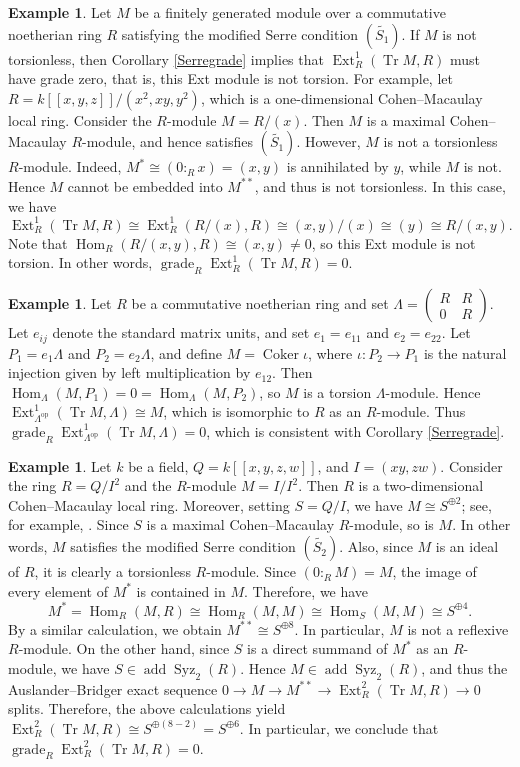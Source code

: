 \documentclass{amsart}
\theoremstyle{definition}
\newtheorem{ex}[thm]{Example}
\theoremstyle{remark}
\numberwithin{equation}{thm}
\def\add{\operatorname{add}}
\def\Cok{\operatorname{Coker}}
\def\Ext{\operatorname{Ext}}
\def\grade{\operatorname{grade}}
\def\Hom{\operatorname{Hom}}
\def\Syz{\operatorname{Syz}}
\def\tr{\operatorname{Tr}}
\begin{document}
\begin{ex}
Let $M$ be a finitely generated module over a commutative noetherian ring $R$ satisfying the modified Serre condition $(\widetilde{S_1})$. If $M$ is not torsionless, then Corollary \ref{Serregrade} implies that $\Ext^1_R(\tr M,R)$ must have grade zero, that is, this Ext module is not torsion.
For example, let $R=k[[x,y,z]]/(x^2,xy,y^2)$, which is a one-dimensional Cohen--Macaulay local ring. 
Consider the $R$-module $M=R/(x)$. Then $M$ is a maximal Cohen--Macaulay $R$-module, and hence satisfies $(\widetilde{S_1})$. However, $M$ is not a torsionless $R$-module. Indeed, $M^*\cong(0:_R x)=(x,y)$ is annihilated by $y$, while $M$ is not. Hence $M$ cannot be embedded into $M^{**}$, and thus is not torsionless.
In this case, we have
$$
\Ext^1_R(\tr M,R)\cong\Ext^1_R(R/(x),R)\cong(x,y)/(x)\cong(y)\cong R/(x,y).
$$
Note that $\Hom_R(R/(x,y),R)\cong(x,y)\ne0$, so this Ext module is not torsion. In other words, $\grade_R\Ext^1_R(\tr M,R)=0$.
\end{ex}

\begin{ex}
Let $R$ be a commutative noetherian ring and set $\Lambda=\begin{pmatrix}R&R\\0&R\end{pmatrix}$. Let $e_{ij}$ denote the standard matrix units, and set $e_1=e_{11}$ and $e_2=e_{22}$. Let $P_1=e_1\Lambda$ and $P_2=e_2\Lambda$, and define $M=\Cok\iota$, where $\iota:P_2\to P_1$ is the natural injection given by left multiplication by $e_{12}$. Then $\Hom_\Lambda(M,P_1)=0=\Hom_\Lambda(M,P_2)$, so $M$ is a torsion $\Lambda$-module. Hence $\Ext^1_{\Lambda^{\mathrm{op}}}(\tr M,\Lambda)\cong M$, which is isomorphic to $R$ as an $R$-module. Thus $\grade_R\Ext^1_{\Lambda^{\mathrm{op}}}(\tr M,\Lambda)=0$, which is consistent with Corollary \ref{Serregrade}.
\end{ex}

\begin{ex}
Let $k$ be a field, $Q=k[[x,y,z,w]]$, and $I=(xy,zw)$. Consider the ring $R=Q/I^2$ and the $R$-module $M=I/I^2$. Then $R$ is a two-dimensional Cohen--Macaulay local ring. Moreover, setting $S=Q/I$, we have $M\cong S^{\oplus 2}$; see, for example, \cite[Theorem 19.9]{Mat}. Since $S$ is a maximal Cohen--Macaulay $R$-module, so is $M$. In other words, $M$ satisfies the modified Serre condition $(\widetilde{S_2})$. Also, since $M$ is an ideal of $R$, it is clearly a torsionless $R$-module.
Since $(0:_R M)=M$, the image of every element of $M^\ast$ is contained in $M$. Therefore, we have 
$$M^\ast=\Hom_R(M,R)\cong\Hom_R(M,M)\cong\Hom_S(M,M)\cong S^{\oplus 4}.$$
By a similar calculation, we obtain $M^{\ast\ast}\cong S^{\oplus 8}$. In particular, $M$ is not a reflexive $R$-module.
On the other hand, since $S$ is a direct summand of $M^\ast$ as an $R$-module, we have $S\in\add\Syz_2(R)$. Hence $M\in\add\Syz_2(R)$, and thus the Auslander--Bridger exact sequence $0\to M\to M^{\ast\ast}\to\Ext^2_R(\tr M,R)\to0$ splits. Therefore, the above calculations yield $\Ext^2_R(\tr M,R)\cong S^{\oplus(8-2)}=S^{\oplus6}$.
In particular, we conclude that $\grade_R\Ext^2_R(\tr M,R)=0$.
\end{ex}
\end{document}
